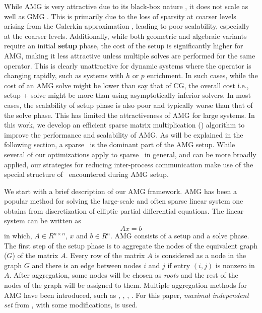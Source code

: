 While AMG is very attractive due to its black-box nature \cite{Dendy82,Vanek:1995,VanekBrezinaMandelEtAl01}, it does not scale as well as GMG \cite{Sundar12}. This is primarily due to
the loss of sparsity at coarser levels arising from the Galerkin approximation \cite{treister2015non}, leading to poor scalability, especially at the coarser levels.
Additionally, while both geometric and algebraic variants require an initial {\bf setup} phase, the cost of the setup is significantly higher for AMG, making it less attractive unless multiple solves are performed for the same operator. This is clearly unattractive for dynamic systems where the operator is changing rapidly, such as systems with $h$ or $p$ enrichment. In such cases, while the cost of an AMG solve might be lower than say that of CG, the overall cost i.e., setup + solve might be more than using asymptotically inferior solvers. In most cases, the scalability of 
setup phase is also poor and typically worse than that of the solve phase. This has limited the attractiveness of AMG for large systems. In this work, we develop an efficient sparse matrix multiplication (\mm) algorithm to improve the performance and scalability of AMG. As will be explained in the following section, a sparse \mm\ is the dominant part of the AMG setup. While several of our optimizations apply to sparse \mm\ in general, and can be more broadly applied, our strategies for reducing inter-process communication make use of the special structure of \mm\ encountered during AMG setup.

We start with a brief description of our AMG framework. 
AMG has been a popular method for solving the large-scale and 
often sparse linear system one obtains from discretization of elliptic partial 
differential equations.  The linear system can be written as
\begin{equation}
 Ax = b
\end{equation}
\noindent in which, $A \in R^{n \times n}$, $x$ and $b \in R^{n}$.
AMG consists of a setup and a solve phase.
The first step of the setup phase is to aggregate the nodes of the equivalent 
graph ($G$) of the matrix $A$. Every row of the matrix $A$ is considered as a node
in the graph $G$ and there is an edge between nodes $i$ and $j$ if entry $(i,j)$ is nonzero in $A$.
After aggregation, %
some nodes will be chosen as \textit{roots} and the
rest of the nodes of the graph will be assigned to them.
Multiple aggregation methods for AMG have been introduced, such as
\cite{bell2012exposing}, \cite{notay2010aggregation},
\cite{Guillard98anaggregation}, %
\cite{DBLP:journals/siammax/Notay06}. %
For this paper, \textit{maximal independent set} from \cite{bell2012exposing}, with some modifications, is used.

